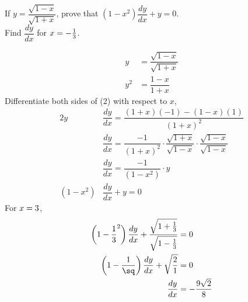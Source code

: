 

\SQUARE{\vbone}\sq

\question[4] If $y=\dfrac{\sqrt{1-x}}{\sqrt{1+x}}$, prove that
$(1-x^2)\dfrac{dy}{dx}+y=0$. \\
Find $\dfrac{dy}{dx}$ for $x=-\frac{1}{3}$.

\watchout

\begin{solution}[\fullpage]
  \begin{align}
    y  &=\dfrac{\sqrt{1-x}}{\sqrt{1+x}} \\
    y^2&=\dfrac{1-x}{1+x}
  \end{align}
  Differentiate both sides of (2) with respect to $x$,
  \begin{align}
         2y &\dfrac{dy}{dx}=\dfrac{(1+x)(-1)-(1-x)(1)}{(1+x)^2} \\
            &\dfrac{dy}{dx}=\dfrac{-1}{(1+x)^2}
                            \cdot\dfrac{\sqrt{1+x}}{\sqrt{1-x}}
                            \cdot\dfrac{\sqrt{1-x}}{\sqrt{1-x}} \\
            &\dfrac{dy}{dx}=\dfrac{-1}{(1-x^2)}\cdot y \\
    (1-x^2) &\dfrac{dy}{dx}+y=0
  \end{align}
  For $x=3$,
  \begin{align}
    \left(1-{\dfrac{1}{\vbone}}^2\right)\dfrac{dy}{dx} +
      \dfrac{\sqrt{1\vbthree\frac{1}{\vbone}}}
            {\sqrt{1\vbfour\frac{1}{\vbone}}}&=0 \\
    \left(1-\dfrac{1}{\sq}\right)
      \dfrac{dy}{dx}+\sqrt{\dfrac{\vbfive}{\vbsix}} &=0 \\
      \dfrac{dy}{dx}&=\vbseven
  \end{align}
\end{solution}

